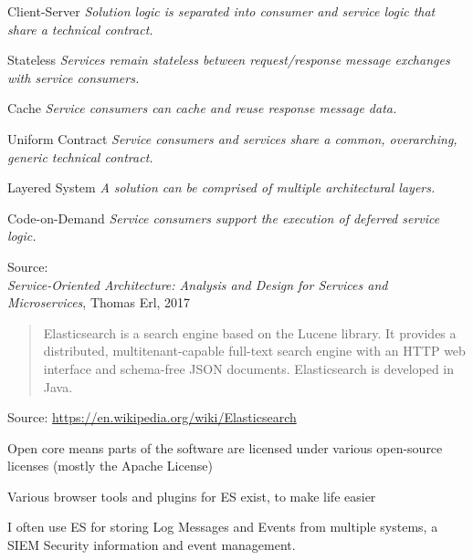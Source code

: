 \documentclass[Screen16to9,17pt]{foils}
\begin{document}
\begin{list2}
\item Client-Server \emph{Solution logic is separated into consumer and service logic that share a technical contract.}
\item Stateless \emph{Services remain stateless between request/response message exchanges with service consumers.}
\item Cache \emph{Service consumers can cache and reuse response message data.}
\item Uniform Contract \emph{Service consumers and services share a common, overarching, generic technical contract.}
\item  Layered System \emph{A solution can be comprised of multiple architectural layers.}
\item Code-on-Demand \emph{Service consumers support the execution of deferred service logic.}
\end{list2}
Source: {\footnotesize\\
\emph{Service‑Oriented Architecture: Analysis and Design for Services and Microservices}, Thomas Erl, 2017}







\begin{quote}
Elasticsearch is a search engine based on the Lucene library. It provides a distributed, multitenant-capable full-text search engine with an HTTP web interface and schema-free JSON documents. Elasticsearch is developed in Java.
\end{quote}

Source: \url{https://en.wikipedia.org/wiki/Elasticsearch}

\begin{list2}
\item Open core means parts of the software are licensed under various open-source licenses (mostly the Apache License)
\item Various browser tools and plugins for ES exist, to make life easier
\item I often use ES for storing Log Messages and Events from multiple systems, a SIEM Security information and event management.
\end{list2}




\begin{quote}

\end{quote}
\end{document}
